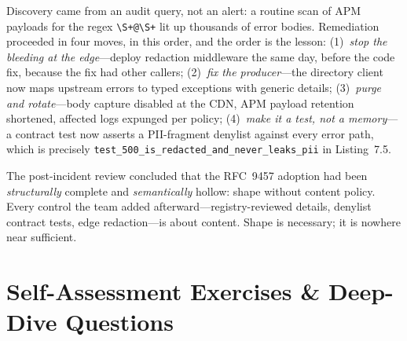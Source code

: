 Discovery came from an audit query, not an alert: a routine scan of APM
payloads for the regex \texttt{\textbackslash S+@\textbackslash S+} lit up
thousands of error bodies. Remediation proceeded in four moves, in this
order, and the order is the lesson: (1)~\emph{stop the bleeding at the
edge}---deploy redaction middleware the same day, before the code fix, because
the fix had other callers; (2)~\emph{fix the producer}---the directory
client now maps upstream errors to typed exceptions with generic details;
(3)~\emph{purge and rotate}---body capture disabled at the CDN, APM payload
retention shortened, affected logs expunged per policy; (4)~\emph{make it a
test, not a memory}---a contract test now asserts a PII-fragment denylist
against every error path, which is precisely
\texttt{test\_500\_is\_redacted\_and\_never\_leaks\_pii} in Listing~7.5.

The post-incident review concluded that the RFC~9457 adoption had been
\emph{structurally} complete and \emph{semantically} hollow: shape without
content policy. Every control the team added afterward---registry-reviewed
details, denylist contract tests, edge redaction---is about content. Shape is
necessary; it is nowhere near sufficient.

\section{Self-Assessment Exercises \& Deep-Dive Questions}

